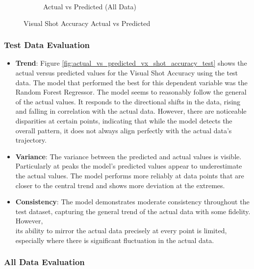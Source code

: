 \begin{figure}[htbp]
\begin{subfigure}[b]{0.49\textwidth}
        \caption{Actual vs Predicted (All Data)}
        \label{fig:actual_vs_predicted_vx_shot_accuracy_all_data}
    \end{subfigure}
    \caption{Visual Shot Accuracy Actual vs Predicted}
    \label{fig:visual_shot_accuracy_comparison}
\end{figure}

\subsubsection*{Test Data Evaluation}

\begin{itemize}
    \item \textbf{Trend}: Figure \ref{fig:actual_vs_predicted_vx_shot_accuracy_test} shows the actual versus predicted values for the Visual Shot Accuracy using the test data. The model that performed
          the best for this dependent variable was the Random Forest Regressor. The model seems to reasonably follow the general of the actual values. It responds to the directional shifts in the data,
          rising and falling in correlation with the actual data. However, there are noticeable disparities at certain points, indicating that while the model detects the overall pattern, it does not always align
          perfectly with the actual data's trajectory.
    \item \textbf{Variance}: The variance between the predicted and actual values is visible. Particularly at peaks the model's predicted values appear to underestimate the actual values. The model performs
          more reliably at data points that are closer to the central trend and shows more deviation at the extremes.
    \item \textbf{Consistency}: The model demonstrates moderate consistency throughout the test dataset, capturing the general trend of the actual data with some fidelity. However, \\
          its ability to mirror the actual data precisely at every point is limited, especially where there is significant fluctuation in the actual data.

\end{itemize}

\subsubsection*{All Data Evaluation}

